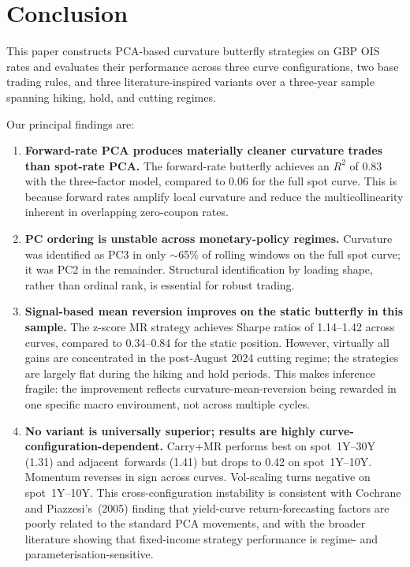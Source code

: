 \documentclass[11pt,a4paper]{article}
\begin{document}
\section{Conclusion}
\label{sec:conclusion}
This paper constructs PCA-based curvature butterfly strategies on GBP
OIS rates and evaluates their performance across three curve
configurations, two base trading rules, and three literature-inspired
variants over a three-year sample spanning hiking, hold, and cutting
regimes.

Our principal findings are:

\begin{enumerate}
  \item \textbf{Forward-rate PCA produces materially cleaner curvature
        trades than spot-rate PCA.}  The forward-rate butterfly achieves
        an $R^{2}$ of 0.83 with the three-factor model, compared to 0.06
        for the full spot curve.  This is because forward rates amplify
        local curvature and reduce the multicollinearity inherent in
        overlapping zero-coupon rates.

  \item \textbf{PC ordering is unstable across monetary-policy regimes.}
        Curvature was identified as PC3 in only $\sim$65\% of rolling
        windows on the full spot curve; it was PC2 in the remainder.
        Structural identification by loading shape, rather than ordinal
        rank, is essential for robust trading.

  \item \textbf{Signal-based mean reversion improves on the static butterfly
        in this sample.}  The z-score MR strategy achieves Sharpe ratios of
        1.14--1.42 across curves, compared to 0.34--0.84 for the static
        position.  However, virtually all gains are concentrated in the
        post-August 2024 cutting regime; the strategies are largely flat
        during the hiking and hold periods.  This makes inference fragile:
        the improvement reflects curvature-mean-reversion being rewarded in
        one specific macro environment, not across multiple cycles.

  \item \textbf{No variant is universally superior; results are highly
        curve-configuration-dependent.}  Carry+MR performs best on
        spot~1Y--30Y (1.31) and adjacent~forwards (1.41) but drops to
        0.42 on spot~1Y--10Y.  Momentum reverses in sign across curves.
        Vol-scaling turns negative on spot~1Y--10Y.  This cross-configuration
        instability is consistent with Cochrane and Piazzesi's~(2005)
        finding that yield-curve return-forecasting factors are poorly
        related to the standard PCA movements, and with the broader
        literature showing that fixed-income strategy performance is
        regime- and parameterisation-sensitive.


\end{enumerate}
\end{document}
